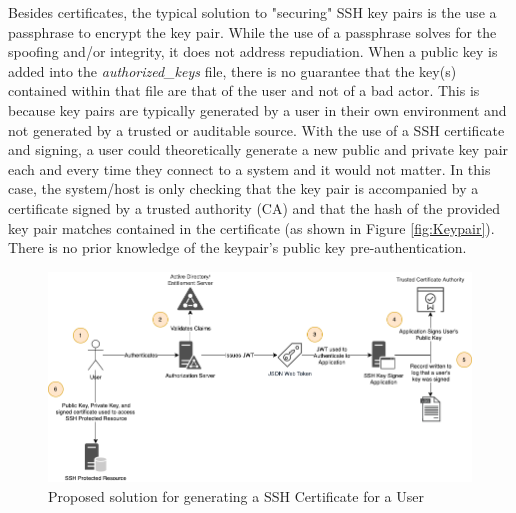 \documentclass[conference]{IEEEtran}
\begin{document}
Besides certificates, the typical solution to "securing" SSH key pairs is the use a passphrase to encrypt the key pair. While the use of a passphrase solves for the spoofing and/or integrity, it does not address repudiation. When a public key is added into the \textit{authorized{\_}keys} file, there is no guarantee that the key(s) contained within that file are that of the user and not of a bad actor. This is because key pairs are typically generated by a user in their own environment and not generated by a trusted or auditable source. With the use of a SSH certificate and signing, a user could theoretically generate a new public and private key pair each and every time they connect to a system and it would not matter. In this case, the system/host is only checking that the key pair is accompanied by a certificate signed by a trusted authority (CA) and that the hash of the provided key pair matches contained in the certificate (as shown in Figure \ref{fig:Keypair}). There is no prior knowledge of the keypair's public key pre-authentication.

\begin{figure}
\centerline{\includegraphics[width=\columnwidth,keepaspectratio]{SignedKeysFlow.png}}
\caption{Proposed solution for generating a SSH Certificate for a User}
\label{fig:SignedKeyFlow}
\end{figure}

\begin{table}[ht]
\caption{Comparison of Developer Experience \& Time using Signed SSH Certificates as compared to Public/Private Key Pairs}
\end{table}
\end{document}
